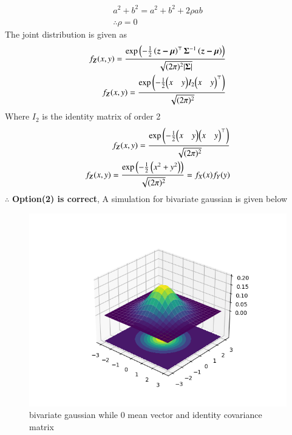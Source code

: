 \documentclass[journal,12pt,twocolumn]{IEEEtran}
\begin{document}
\begin{enumerate}
\begin{align}
a^2+b^2=a^2+b^2+2\rho ab\\
\therefore \rho=0\label{eq:rho}
\end{align}
The joint distribution is given as
\begin{align}
f_{\boldsymbol{Z}}(x,y)=\frac{\text{exp}\left(-\frac{1}{2}\left(\boldsymbol{z-\mu}\right)^\top\boldsymbol{\Sigma}^{-1}\left(\boldsymbol{z-\mu}\right)\right)}{\sqrt{(2\pi)^2\vert\boldsymbol{\Sigma}\vert}}\\
f_{\boldsymbol{Z}}(x,y)=\frac{\text{exp}\left(-\frac{1}{2}{\begin{pmatrix} x &y\end{pmatrix}} I_2{\begin{pmatrix} x &y\end{pmatrix}}^\top\right)}{\sqrt{(2\pi)^2}}
\end{align}
Where $I_2$ is the identity matrix of order 2
\begin{align}
f_{\boldsymbol{Z}}(x,y)=\frac{\text{exp}\left(-\frac{1}{2}{\begin{pmatrix} x &y\end{pmatrix}} {\begin{pmatrix} x &y\end{pmatrix}}^\top\right)}{\sqrt{(2\pi)^2}}\\
f_{\boldsymbol{Z}}(x,y)=\frac{\text{exp}\left(-\frac{1}{2}\left(x^2+y^2\right)\right)}{\sqrt{(2\pi)^2}}=f_X(x)f_Y(y)
\end{align}
$\therefore$ \textbf{Option(2) is correct}, A simulation for bivariate gaussian is given below
\begin{figure}[H]
\centering
\includegraphics[width=\linewidth]{figure/plot}
\caption{bivariate gaussian while 0 mean vector and identity covariance matrix}

\end{figure}
\end{enumerate}
\end{document}
